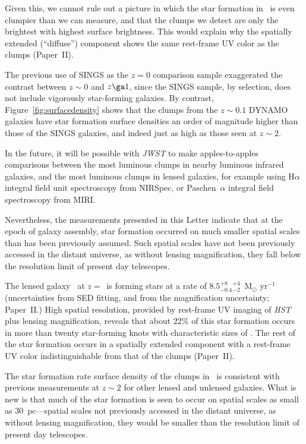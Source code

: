 Given this, we cannot rule out a picture in which the star formation in \arcname\ 
is even clumpier than we can measure, and that the clumps we detect are only the 
brightest with highest surface brightness.  This would explain why 
the spatially extended (``diffuse'') component shows the same 
rest-frame UV color as the clumps (Paper~II).

The previous use of SINGS \citep{Kennicutt:2003jt} as the 
$z=0$ comparison sample  exaggerated 
the contrast between $z\sim0$ and $z\ga1$, 
since the SINGS sample, by selection, does not include vigorously star-forming galaxies. 
By contrast, Figure~\ref{fig:surfacedensity} shows that 
the clumps from the $z\sim 0.1$ DYNAMO galaxies \citep{Fisher:2016jp} 
have star formation surface densities
an order of magnitude higher than those of the SINGS galaxies, and
indeed just as high as those seen at $z \sim 2$.

In the future, it will be possible with \textit{JWST} to make apples-to-apples 
comparisons between the most luminous clumps in nearby luminous infrared galaxies, 
and the most luminous clumps in lensed galaxies, 
for example using  H$\alpha$ integral field unit spectroscopy from NIRSpec, 
or Paschen~$\alpha$ integral field spectroscopy from MIRI.

Nevertheless, the measurements presented in this Letter indicate that at the
epoch of galaxy assembly,  star formation occurred on much smaller 
spatial scales than has been previously assumed.  
Such spatial scales have not been 
previously accessed in the distant universe, as without lensing
magnification, they fall below the resolution limit of present day telescopes.

The lensed galaxy \arcname\ at $z=$\zA\  is forming stars at a rate of 
$8.5$$^{+8}_{-0.4}$$^{+4}_{-2}$~M$_{\odot}$ yr$^{-1}$ (uncertainties from SED fitting,
and from the magnification uncertainty; Paper~II.)
High spatial resolution, provided by rest-frame UV imaging of \textit{HST} plus 
lensing magnification, reveals that about  $22\%$ of this star formation occurs
in more than twenty star-forming knots with characteristic
sizes of   \rangeofscales .
The rest of the star formation occurs in a spatially extended component 
with a rest-frame UV color indistinguishable from that of the clumps
(Paper~II).

The star formation rate surface density of the clumps in \arcname\ 
is consistent with previous measurements
at $z\sim2$ for other lensed and unlensed galaxies.  What is new is that much of the 
star formation is seen to  occur on spatial scales as small as 30~pc---spatial scales not 
previously accessed in the distant universe, as without lensing
magnification, they would be smaller than the resolution limit of
present day telescopes.

